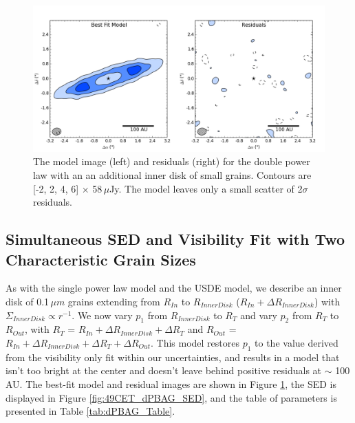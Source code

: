 {{\begin{figure}[H]
\centering
\includegraphics[width = 1\textwidth]{49CET_dPBAG_ModelResidual.png}
\caption{The model image (left) and residuals (right) for the double power law with an an additional inner disk of small grains. Contours are [-2, 2, 4, 6] $\times$ 58$\,\mu$Jy. The model leaves only a small scatter of 2$\sigma$ residuals.}
\label{fig:49CET_dPBAG_ModelResidual}
\end{figure}

\subsection{Simultaneous SED and Visibility Fit with Two Characteristic Grain Sizes}

As with the single power law model and the USDE model, we describe an inner disk of 0.1$\,\mu m$ grains extending from $R_{In}$ to $R_{Inner Disk}$ ($R_{In} + \Delta R_{Inner Disk}$) with $\Sigma_{Inner Disk} \propto r^{-1}$. We now vary $p_{1}$ from $R_{Inner Disk}$ to $R_{T}$ and vary $p_{2}$ from $R_{T}$ to $R_{Out}$, with $R_{T}$ = $R_{In} + \Delta R_{Inner Disk} + \Delta R_{T}$ and $R_{Out}$ = $R_{In} + \Delta R_{Inner Disk} + \Delta R_{T} + \Delta R_{Out}$. This model restores $p_{1}$ to the value derived from the visibility only fit within our uncertainties, and results in a model that isn't too bright at the center and doesn't leave behind positive residuals at $\sim$ 100\,AU. The best-fit model and residual images are shown in Figure \ref{fig:49CET_dPBAG_ModelResidual}, the SED is displayed in Figure \ref{fig:49CET_dPBAG_SED}, and the table of parameters is presented in Table \ref{tab:dPBAG_Table}.

}}
